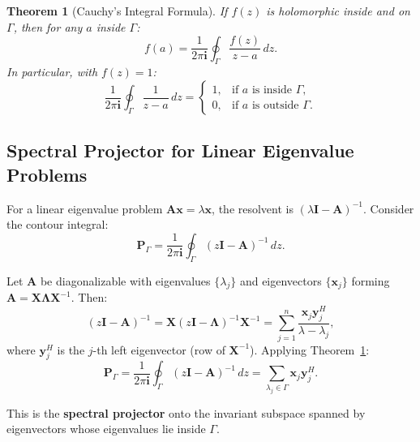 \documentclass[12pt,a4paper]{article}
\newtheorem{theorem}{Theorem}[section]
\theoremstyle{definition}
\newcommand{\key}[1]{\textcolor{keypoint}{\textbf{#1}}}
\begin{document}
\begin{theorem}[Cauchy's Integral Formula]\label{thm:CIF}
If $f(z)$ is holomorphic inside and on $\Gamma$, then for any $a$ inside $\Gamma$:
\begin{equation}
f(a) = \frac{1}{2\pi\mathbf{i}} \oint_{\Gamma} \frac{f(z)}{z - a}\,dz.
\end{equation}
In particular, with $f(z)=1$:
\begin{equation}
\frac{1}{2\pi\mathbf{i}} \oint_{\Gamma} \frac{1}{z - a}\,dz = \begin{cases}
1, & \text{if } a \text{ is inside } \Gamma,\\
0, & \text{if } a \text{ is outside } \Gamma.
\end{cases}
\end{equation}
\end{theorem}

\subsection{Spectral Projector for Linear Eigenvalue Problems}

For a linear eigenvalue problem $\mathbf{A}\mathbf{x} = \lambda\mathbf{x}$, the resolvent is $(\lambda\mathbf{I} - \mathbf{A})^{-1}$. Consider the contour integral:
\begin{equation}\label{eq:linear_projector}
\mathbf{P}_{\Gamma} = \frac{1}{2\pi\mathbf{i}} \oint_{\Gamma} (z\mathbf{I} - \mathbf{A})^{-1}\,dz.
\end{equation}

Let $\mathbf{A}$ be diagonalizable with eigenvalues $\{\lambda_j\}$ and eigenvectors $\{\mathbf{x}_j\}$ forming $\mathbf{A} = \mathbf{X}\mathbf{\Lambda}\mathbf{X}^{-1}$. Then:
\begin{equation}
(z\mathbf{I} - \mathbf{A})^{-1} = \mathbf{X}(z\mathbf{I} - \mathbf{\Lambda})^{-1}\mathbf{X}^{-1} = \sum_{j=1}^{n} \frac{\mathbf{x}_j\mathbf{y}_j^{H}}{\lambda - \lambda_j},
\end{equation}
where $\mathbf{y}_j^{H}$ is the $j$-th left eigenvector (row of $\mathbf{X}^{-1}$). Applying Theorem~\ref{thm:CIF}:
\begin{equation}\label{eq:spectral_projector_derivation}
\boxed{\mathbf{P}_{\Gamma} = \frac{1}{2\pi\mathbf{i}} \oint_{\Gamma} (z\mathbf{I} - \mathbf{A})^{-1}\,dz = \sum_{\lambda_j \in \Gamma} \mathbf{x}_j\mathbf{y}_j^{H}}.
\end{equation}

This is the \key{spectral projector} onto the invariant subspace spanned by eigenvectors whose eigenvalues lie inside $\Gamma$.
\end{document}
